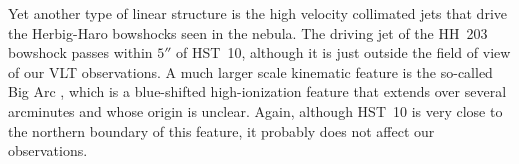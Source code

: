 \documentclass[useAMS,usenatbib]{mn2e}
\begin{document}
Yet another type of linear structure is the high velocity collimated jets 
that drive the Herbig-Haro bowshocks seen in the nebula. 
The driving jet of the HH~203 bowshock \citep{2004AJ....127.3456D} 
passes within \(5''\) of HST~10, 
although it is just outside the field of view of our VLT observations. 
A much larger scale kinematic feature is the so-called Big Arc 
\citep{2004AJ....127.3456D, 2007AJ....133..952G}, 
which is a blue-shifted high-ionization feature 
that extends over several arcminutes and whose origin is unclear. 
Again, although HST~10 is very close to the northern boundary of this feature, 
it probably does not affect our observations.






\end{document}
